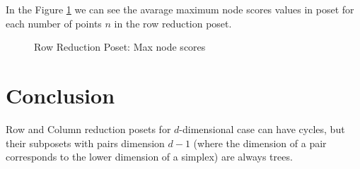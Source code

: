 \documentclass{article}
\begin{document}
\par In the Figure \ref{fig:scores_node_max_rrp} we can see the avarage maximum node scores values in poset for each number of points $n$ in the row reduction poset.
\begin{figure}[ht]
  \vspace{-96pt}
  \centering
  \hspace*{-0.18999999999999995\textwidth}
  \caption{Row Reduction Poset: Max node scores}
  \label{fig:scores_node_max_rrp}
\end{figure}

\section{Conclusion}
\par Row and Column reduction posets for $d$-dimensional case can have cycles, but their subposets with pairs dimension $d-1$ (where the dimension of a pair corresponds to the lower dimension of a simplex) are always trees.
\end{document}
